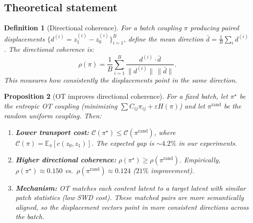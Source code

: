 \documentclass[letterpaper]{article}
\newtheorem{proposition}{Proposition}[section]
\newtheorem{definition}[proposition]{Definition}
\newcommand{\E}{\mathbb{E}}
\newcommand{\cC}{\mathcal{C}}
\begin{document}
\subsection{Theoretical statement}

\begin{definition}[Directional coherence]
For a batch coupling $\pi$ producing paired displacements
$\{d^{(i)} = z_1^{(i)} - z_0^{(i)}\}_{i=1}^B$, define the mean direction
$\bar d = \frac{1}{B}\sum_i d^{(i)}$. The directional coherence is:
\begin{equation}
    \rho(\pi) = \frac{1}{B}\sum_{i=1}^B
    \frac{d^{(i)}\cdot\bar d}{\|d^{(i)}\|\,\|\bar d\|}.
    \label{eq:directional_coherence}
\end{equation}
This measures how consistently the displacements point in the same direction.
\end{definition}

\begin{proposition}[OT improves directional coherence]
\label{prop:ot_directional}
For a fixed batch, let $\pi^{\star}$ be the entropic OT coupling
(minimizing $\sum C_{ij}\pi_{ij}+\varepsilon H(\pi)$) and let
$\pi^{\text{rand}}$ be the random uniform coupling. Then:

\begin{enumerate}[nosep]
    \item \textbf{Lower transport cost:}
    $\cC(\pi^{\star}) \leq \cC(\pi^{\text{rand}})$, where
    $\cC(\pi)=\E_\pi[c(z_0,z_1)]$.
    The expected gap is $\sim 4.2\%$ in our experiments.
    
    \item \textbf{Higher directional coherence:}
    $\rho(\pi^{\star}) \geq \rho(\pi^{\text{rand}})$.
    Empirically, $\rho(\pi^{\star}) \approx 0.150$ vs.\
    $\rho(\pi^{\text{rand}}) \approx 0.124$ ($21\%$ improvement).
    
    \item \textbf{Mechanism:}
    OT matches each content latent to a target latent with similar
    patch statistics (low SWD cost). These matched pairs are more
    semantically aligned, so the displacement vectors point in
    more consistent directions across the batch.
\end{enumerate}
\end{proposition}
\end{document}
